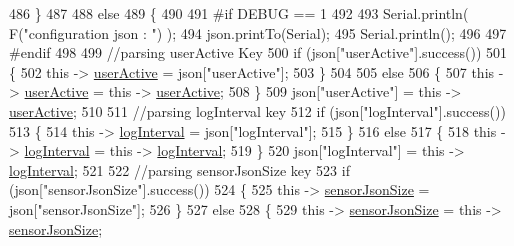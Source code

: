 \begin{DoxyCode}
486         \}
487 
488         \textcolor{keywordflow}{else}
489         \{   
490         
491 \textcolor{preprocessor}{        #if DEBUG == 1}
492             
493             Serial.println( F(\textcolor{stringliteral}{"configuration json : "}) );
494             json.printTo(Serial);
495             Serial.println();
496         
497 \textcolor{preprocessor}{        #endif}
498             
499             \textcolor{comment}{//parsing userActive Key}
500             \textcolor{keywordflow}{if} (json[\textcolor{stringliteral}{"userActive"}].success())
501             \{
502                 \textcolor{keyword}{this} -> \hyperlink{classCoolBoard_a6395459131d6889a3005f79c7a35e964}{userActive} = json[\textcolor{stringliteral}{"userActive"}];
503             \}
504 
505             \textcolor{keywordflow}{else}
506             \{
507                 \textcolor{keyword}{this} -> \hyperlink{classCoolBoard_a6395459131d6889a3005f79c7a35e964}{userActive} = \textcolor{keyword}{this} -> \hyperlink{classCoolBoard_a6395459131d6889a3005f79c7a35e964}{userActive};
508             \}
509             json[\textcolor{stringliteral}{"userActive"}] = \textcolor{keyword}{this} -> \hyperlink{classCoolBoard_a6395459131d6889a3005f79c7a35e964}{userActive};
510 
511             \textcolor{comment}{//parsing logInterval key}
512             \textcolor{keywordflow}{if} (json[\textcolor{stringliteral}{"logInterval"}].success())
513             \{
514                 \textcolor{keyword}{this} -> \hyperlink{classCoolBoard_a4de0096d575d66b472c4c1f0111fd452}{logInterval} = json[\textcolor{stringliteral}{"logInterval"}];
515             \}
516             \textcolor{keywordflow}{else}
517             \{
518                 \textcolor{keyword}{this} -> \hyperlink{classCoolBoard_a4de0096d575d66b472c4c1f0111fd452}{logInterval} = \textcolor{keyword}{this} -> \hyperlink{classCoolBoard_a4de0096d575d66b472c4c1f0111fd452}{logInterval};
519             \}
520             json[\textcolor{stringliteral}{"logInterval"}] = \textcolor{keyword}{this} -> \hyperlink{classCoolBoard_a4de0096d575d66b472c4c1f0111fd452}{logInterval};
521 
522             \textcolor{comment}{//parsing sensorJsonSize key}
523             \textcolor{keywordflow}{if} (json[\textcolor{stringliteral}{"sensorJsonSize"}].success())
524             \{
525                 \textcolor{keyword}{this} -> \hyperlink{classCoolBoard_a58e4b6072e3ac8b141ec0befb479208e}{sensorJsonSize} = json[\textcolor{stringliteral}{"sensorJsonSize"}];
526             \}
527             \textcolor{keywordflow}{else}
528             \{
529                 \textcolor{keyword}{this} -> \hyperlink{classCoolBoard_a58e4b6072e3ac8b141ec0befb479208e}{sensorJsonSize} = \textcolor{keyword}{this} -> \hyperlink{classCoolBoard_a58e4b6072e3ac8b141ec0befb479208e}{sensorJsonSize};

\end{DoxyCode}
